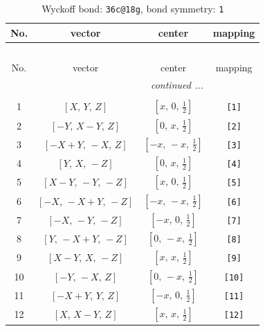 \documentclass[fleqn,8pt]{jsarticle}
\begin{document}
\begin{longtable}{cccc}
\caption{Wyckoff bond: {\tt 36c@18g}, bond symmetry: {\tt 1}}
 \\
 \hline \hline
No. & vector & center & mapping \\ \hline \endfirsthead

\multicolumn{3}{l}{\tablename\ \thetable{}} \\
 \hline \hline
No. & vector & center & mapping \\ \hline \endhead

 \hline \hline
\multicolumn{3}{r}{\footnotesize\it continued ...} \\ \endfoot

 \hline \hline
\multicolumn{3}{r}{} \\ \endlastfoot

1 & $\left[ X,\, Y,\, Z \right]$ & $\left[ x,\, 0,\, \frac{1}{2} \right]$ & {\tt [1]} \\ \hline
2 & $\left[ - Y,\, X - Y,\, Z \right]$ & $\left[ 0,\, x,\, \frac{1}{2} \right]$ & {\tt [2]} \\ \hline
3 & $\left[ - X + Y,\, - X,\, Z \right]$ & $\left[ - x,\, - x,\, \frac{1}{2} \right]$ & {\tt [3]} \\ \hline
4 & $\left[ Y,\, X,\, - Z \right]$ & $\left[ 0,\, x,\, \frac{1}{2} \right]$ & {\tt [4]} \\ \hline
5 & $\left[ X - Y,\, - Y,\, - Z \right]$ & $\left[ x,\, 0,\, \frac{1}{2} \right]$ & {\tt [5]} \\ \hline
6 & $\left[ - X,\, - X + Y,\, - Z \right]$ & $\left[ - x,\, - x,\, \frac{1}{2} \right]$ & {\tt [6]} \\ \hline
7 & $\left[ - X,\, - Y,\, - Z \right]$ & $\left[ - x,\, 0,\, \frac{1}{2} \right]$ & {\tt [7]} \\ \hline
8 & $\left[ Y,\, - X + Y,\, - Z \right]$ & $\left[ 0,\, - x,\, \frac{1}{2} \right]$ & {\tt [8]} \\ \hline
9 & $\left[ X - Y,\, X,\, - Z \right]$ & $\left[ x,\, x,\, \frac{1}{2} \right]$ & {\tt [9]} \\ \hline
10 & $\left[ - Y,\, - X,\, Z \right]$ & $\left[ 0,\, - x,\, \frac{1}{2} \right]$ & {\tt [10]} \\ \hline
11 & $\left[ - X + Y,\, Y,\, Z \right]$ & $\left[ - x,\, 0,\, \frac{1}{2} \right]$ & {\tt [11]} \\ \hline
12 & $\left[ X,\, X - Y,\, Z \right]$ & $\left[ x,\, x,\, \frac{1}{2} \right]$ & {\tt [12]} \\
\end{longtable}
\end{document}
